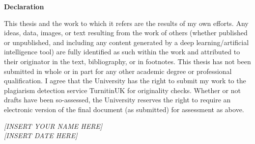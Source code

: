 \thispagestyle{plain} %
\newpage

\begin{center}
  \textbf{Declaration}
\end{center}

\vspace{1cm} %

This thesis and the work to which it refers are the results of my own efforts. Any ideas, data, images, or text resulting from the work of others (whether published or unpublished, and including any content generated by a deep learning/artificial intelligence tool) are fully identified as such within the work and attributed to their originator in the text, bibliography, or in footnotes. This thesis has not been submitted in whole or in part for any other academic degree or professional qualification. I agree that the University has the right to submit my work to the plagiarism detection service TurnitinUK for originality checks. Whether or not drafts have been so-assessed, the University reserves the right to require an electronic version of the final document (as submitted) for assessment as above.

\vspace{2cm} %

\begin{flushright} %
\textit{[INSERT YOUR NAME HERE]} \\ %
\textit{[INSERT DATE HERE]} \\ %
\end{flushright}

\newpage %
